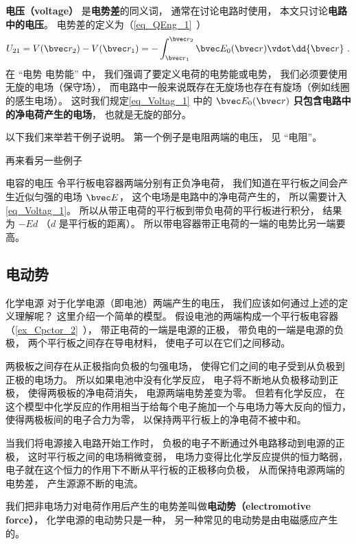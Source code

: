 

\textbf{电压（voltage）} 是\textbf{电势差}的同义词， 通常在讨论电路时使用， 本文只讨论\textbf{电路中的电压}。 电势差的定义为（\autoref{eq_QEng_1}~）
\begin{equation}\label{eq_Voltag_1}
U_{21} = V(\bvec r_2) - V(\bvec r_1) = - \int_{\bvec r_1}^{\bvec r_2} \bvec E_0(\bvec r) \vdot \dd{\bvec r}~.
\end{equation}
在 “电势 电势能” 中， 我们强调了要定义电荷的电势能或电势， 我们必须要使用无旋的电场（保守场）， 而电路中一般来说既存在无旋场也存在有旋场（例如线圈的感生电场）。 这时我们规定\autoref{eq_Voltag_1} 中的 $\bvec E_0(\bvec r)$ \textbf{只包含电路中的净电荷产生的电场}， 也就是无旋的部分。

以下我们来举若干例子说明。 第一个例子是电阻两端的电压， 见 “电阻”。

再来看另一些例子
\begin{example}{电容的电压}
令平行板电容器两端分别有正负净电荷， 我们知道在平行板之间会产生近似匀强的电场 $\bvec E$， 这个电场是电路中的净电荷产生的， 所以需要计入\autoref{eq_Voltag_1}。 所以从带正电荷的平行板到带负电荷的平行板进行积分， 结果为 $-E d$ （$d$ 是平行板的距离）。 所以带电容器带正电荷的一端的电势比另一端要高。
\end{example}

\subsection{电动势}
\begin{example}{化学电源}
对于化学电源（即电池）两端产生的电压， 我们应该如何通过上述的定义理解呢？ 这里介绍一个简单的模型。 假设电池的两端构成一个平行板电容器（\autoref{ex_Cpctor_2}~）， 带正电荷的一端是电源的正极， 带负电的一端是电源的负极， 两个平行板之间存在导电材料， 使电子可以在它们之间移动。

两极板之间存在从正极指向负极的匀强电场， 使得它们之间的电子受到从负极到正极的电场力。 所以如果电池中没有化学反应， 电子将不断地从负极移动到正极， 使得两极板的净电荷消失， 电源两端电势差变为零。 但若有化学反应， 在这个模型中化学反应的作用相当于给每个电子施加一个与电场力等大反向的恒力， 使得两极板间的电子合力为零， 以保持两平行板上的净电荷不被中和。

当我们将电源接入电路开始工作时， 负极的电子不断通过外电路移动到电源的正极， 这时平行板之间的电场稍微变弱， 电场力变得比化学反应提供的恒力略弱， 电子就在这个恒力的作用下不断从平行板的正极移向负极， 从而保持电源两端的电势差， 产生源源不断的电流。
\end{example}
我们把非电场力对电荷作用后产生的电势差叫做\textbf{电动势（electromotive force）}， 化学电源的电动势只是一种， 另一种常见的电动势是由电磁感应产生的。

